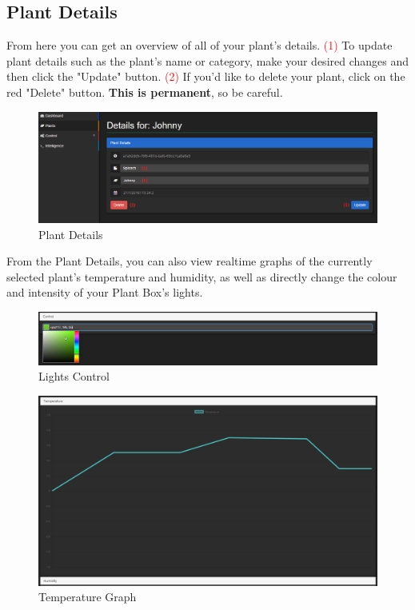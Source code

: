 \documentclass{article}
\begin{document}
	\subsection{Plant Details}
	\label{sec:plant-details}
	From here you can get an overview of all of your plant's details.
	\newline
	\textcolor{red}{(1)} To update plant details such as the plant's name or category, make your desired changes and then click the "Update" button.
	\newline
	\textcolor{red}{(2)} If you'd like to delete your plant, click on the red "Delete" button. \textbf{This is permanent}, so be careful.
	\begin{figure}[H]
		\includegraphics[width=\textwidth]{../images/UserManual/plant-details.PNG}
		\caption{Plant Details}
	\end{figure}
	
	From the Plant Details, you can also view realtime graphs of the currently selected plant's temperature and humidity, as well as directly change the colour and intensity of your Plant Box's lights.
	
	\begin{figure}[H]
		\includegraphics[width=\textwidth]{../images/UserManual/lights.png}
		\caption{Lights Control}
	\end{figure}	
	
	\begin{figure}[H]
		\includegraphics[width=\textwidth]{../images/UserManual/temperature.png}
		\caption{Temperature Graph}
	\end{figure}
	
\end{document}

